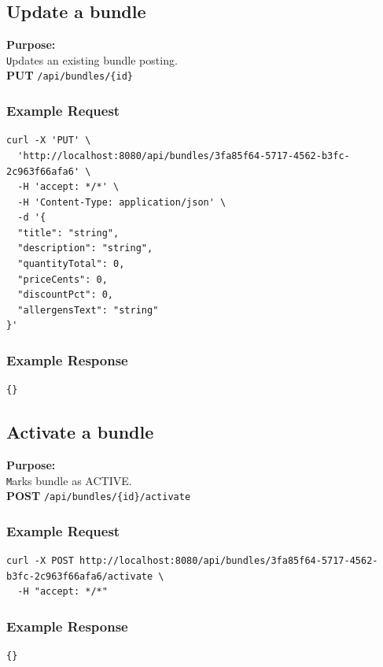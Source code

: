 \documentclass[a4paper,11pt]{article}
\begin{document}
\subsection{Update a bundle}
\textbf{Purpose:} \\ \texttt Updates an existing bundle posting. \\

\textbf{PUT} \texttt{/api/bundles/\{id\}}

\subsubsection*{Example Request}
\begin{lstlisting}
curl -X 'PUT' \
  'http://localhost:8080/api/bundles/3fa85f64-5717-4562-b3fc-2c963f66afa6' \
  -H 'accept: */*' \
  -H 'Content-Type: application/json' \
  -d '{
  "title": "string",
  "description": "string",
  "quantityTotal": 0,
  "priceCents": 0,
  "discountPct": 0,
  "allergensText": "string"
}'
\end{lstlisting}

\subsubsection*{Example Response}
\begin{lstlisting}
{}
\end{lstlisting}

\subsection{Activate a bundle}
\textbf{Purpose:} \\ \texttt Marks bundle as ACTIVE. \\


\textbf{POST} \texttt{/api/bundles/\{id\}/activate}

\subsubsection*{Example Request}
\begin{lstlisting}
curl -X POST http://localhost:8080/api/bundles/3fa85f64-5717-4562-b3fc-2c963f66afa6/activate \
  -H "accept: */*"
\end{lstlisting}

\subsubsection*{Example Response}
\begin{lstlisting}
{}
\end{lstlisting}
\end{document}
